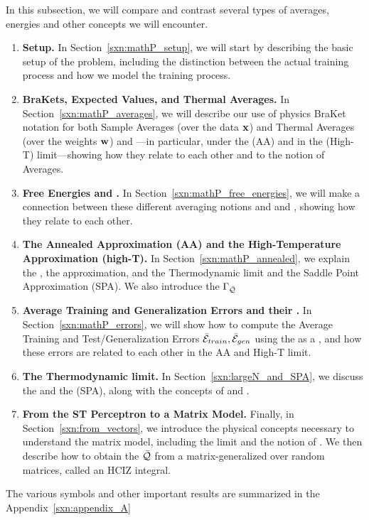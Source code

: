 In this subsection, we will compare and contrast several types of averages, energies and other \Thermodynamic concepts we will encounter. 
\begin{enumerate}[label=4.2.\arabic*]
\item
  \textbf{Setup.}
  In Section~\ref{sxn:mathP_setup}, 
we will start by describing the basic setup of the problem, including the distinction between the actual training process and how we model the training process.

 \item
 \textbf{BraKets, Expected Values, and Thermal Averages.}
In Section~\ref{sxn:mathP_averages}, 
we will describe our use of physics BraKet notation for both Sample Averages (over the data ${\mathbf{x}}$) and Thermal Averages (over the weights ${\mathbf{w}}$) and ---in particular, under the \AnnealedApproximation (AA) and in the \HighTemperature (High-T) limit---showing how they relate to each other and to the notion of \Replica Averages.
%
\item
  \textbf{Free Energies and \GeneratingFunctions.} 
In Section~\ref{sxn:mathP_free_energies}, 
we will make a connection between these different averaging notions and \FreeEnergies and \GeneratingFunctions, showing how they relate to each other.
%

\item
  \textbf{The Annealed Approximation (AA) and the High-Temperature Approximation (high-T).}
  In Section~\ref{sxn:mathP_annealed}, we explain the \AnnealedApproximation, the \HighTemperature approximation,
  and the Thermodynamic \LargeN limit and the Saddle Point Approximation (SPA).
  We also introduce the \Quality \GeneratingFunction $\Gamma_{\bar{\mathcal{Q}}}$%
  \item
    \textbf{Average Training and Generalization Errors and their \GeneratingFunctions.}
  In Section~\ref{sxn:mathP_errors}, we will show how to compute the Average Training and Test/Generalization Errors $\bar{\mathcal{E}}_{train}, \bar{\mathcal{E}}_{gen}$
using the \FreeEnergy as a \GeneratingFunction, and how these errors are related to each other in the AA and High-T limit. 
%
\item 
  \textbf{The Thermodynamic limit.}
  In Section~\ref{sxn:largeN_and_SPA}, we discuss the \LargeN \ThermodynamicLimit and the \SaddlePointApproximation (SPA),
  along with the concepts of \SelfAveraging and \WickRotations.
%
\item 
  \textbf{From the ST Perceptron to a Matrix Model.} 
  Finally, in Section~\ref{sxn:from_vectors}, we introduce the physical concepts necessary to understand the \SETOL matrix model, including the \WideLayer \LargeN limit and the notion of \SizeConsistency.  We then describe how to obtain the \LayerQuality $\bar{\mathcal{Q}}$ from a matrix-generalized \ThermalAverage over random matrices, called an HCIZ integral.
\end{enumerate}
The various symbols and other important results are summarized in the Appendix~\ref{sxn:appendix_A}


